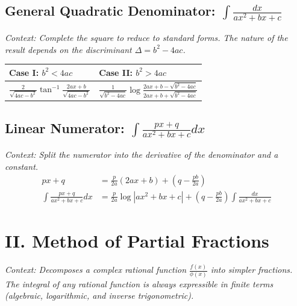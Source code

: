 \documentclass[11pt, a4paper]{article}
\begin{document}
\vspace{0.3cm}

\subsection*{\color{secondary} General Quadratic Denominator: $\int \frac{dx}{ax^2+bx+c}$}
\textit{\small Context: Complete the square to reduce to standard forms. The nature of the result depends on the discriminant $\Delta = b^2-4ac$.}
\vspace{0.15cm}
\begin{center}
\begin{tabular}{@{}p{} p{}@{}}
\toprule
\textbf{Case I: $b^2 < 4ac$} & \textbf{Case II: $b^2 > 4ac$} \\
\midrule
$\frac{2}{\sqrt{4ac-b^2}} \tan^{-1} \frac{2ax+b}{\sqrt{4ac-b^2}}$ & $\frac{1}{\sqrt{b^2-4ac}} \log \frac{2ax+b-\sqrt{b^2-4ac}}{2ax+b+\sqrt{b^2-4ac}}$ \\
\bottomrule
\end{tabular}
\end{center}

\vspace{0.3cm}

\subsection*{\color{secondary} Linear Numerator: $\int \frac{px+q}{ax^2+bx+c} dx$}
\textit{\small Context: Split the numerator into the derivative of the denominator and a constant.}
\begin{align*}
    px+q &= \frac{p}{2a}(2ax+b) + \left(q - \frac{pb}{2a}\right) \\
    \int \frac{px+q}{ax^2+bx+c} dx &= \frac{p}{2a} \log|ax^2+bx+c| + \left(q - \frac{pb}{2a}\right) \int \frac{dx}{ax^2+bx+c}
\end{align*}


\section*{\color{primary} II. Method of Partial Fractions}

\textit{\small Context: Decomposes a complex rational function $\frac{f(x)}{\phi(x)}$ into simpler fractions. The integral of any rational function is always expressible in finite terms (algebraic, logarithmic, and inverse trigonometric).}
\end{document}
